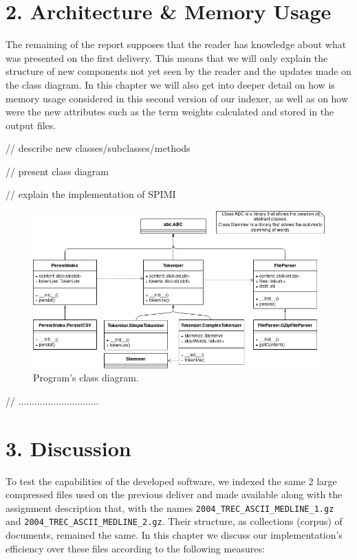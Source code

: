 \documentclass[12pt]{article}
\begin{document}
\section*{2. Architecture \& Memory Usage}

The remaining of the report supposes that the reader has knowledge about what
was presented on the first delivery. 
This means that we will only explain the structure of new components not yet
seen by the reader and the updates made on the class diagram.
In this chapter we will also get into deeper detail on how is memory usage
considered in this second version of our indexer, as well as on how were the 
new attributes such as the term weights calculated and stored in the output 
files.

// describe new classes/subclasses/methods

// present class diagram

// explain the implementation of SPIMI

\begin{figure}[h!]
  \includegraphics[width=\linewidth]{ClassDiagram.png}
  \caption{Program's class diagram.}
  \label{fig:classdiagram}
\end{figure}

// ..............................

\newpage
\section*{3. Discussion}

To test the capabilities of the developed software, we indexed the same
2 large compressed files used on the previous deliver and made available 
along with the assignment description that, with the names 
\texttt{2004\_TREC\_ASCII\_MEDLINE\_1.gz} and 
\texttt{2004\_TREC\_ASCII\_MEDLINE\_2.gz}.
Their structure, as collections (corpus) of documents, remained the same.
In this chapter we discuss our implementation's efficiency over these 
files according to the following measures:
\end{document}
